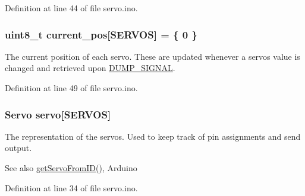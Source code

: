 Definition at line 44 of file servo.\+ino.

\hypertarget{servo_8ino_ae88c6e452cc6a2dc7af59897c42d8e1e}{}
\subsubsection[{current\+\_\+pos}]{\setlength{\rightskip}{0pt plus 5cm}uint8\+\_\+t current\+\_\+pos\mbox{[}{\bf S\+E\+R\+V\+O\+S}\mbox{]} = \{ 0 \}}\label{servo_8ino_ae88c6e452cc6a2dc7af59897c42d8e1e}
The current position of each servo. These are updated whenever a servos value is changed and retrieved upon \hyperlink{servo_8ino_a99fb83031ce9923c84392b4e92f956b5a31cd671c80d04a4acc2d8256ec960c90}{D\+U\+M\+P\+\_\+\+S\+I\+G\+N\+A\+L}. 

Definition at line 49 of file servo.\+ino.

\hypertarget{servo_8ino_adf02be48d17da3f4a229ebfdfda2fa71}{}
\subsubsection[{servo}]{\setlength{\rightskip}{0pt plus 5cm}Servo servo\mbox{[}{\bf S\+E\+R\+V\+O\+S}\mbox{]}}\label{servo_8ino_adf02be48d17da3f4a229ebfdfda2fa71}
The representation of the servos. Used to keep track of pin assignments and send output. \begin{DoxySeeAlso}{See also}
\hyperlink{rhand_8h_a13edec01163cd92d516634c36fe06aeb}{get\+Servo\+From\+I\+D()}, Arduino 
\end{DoxySeeAlso}


Definition at line 34 of file servo.\+ino.

